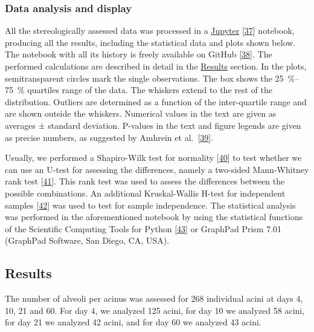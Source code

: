 \documentclass[
  american,
]{article}
\begin{document}
\hypertarget{data-analysis-and-display}{%
\subsubsection{Data analysis and display}\label{data-analysis-and-display}}

All the stereologically assessed data was processed in a \href{http://jupyter.org/}{Jupyter} {[}\protect\hyperlink{ref-pQ6Wbz73}{37}{]} notebook, producing all the results, including the statistical data and plots shown below.
The notebook with all its history is freely available on GitHub {[}\protect\hyperlink{ref-V87xbt0b}{38}{]}.
The performed calculations are described in detail in the \protect\hyperlink{results}{Results} section.
In the plots, semitransparent circles mark the single observations.
The box shows the 25~\%--75~\% quartiles range of the data.
The whiskers extend to the rest of the distribution.
Outliers are determined as a function of the inter-quartile range and are shown outside the whiskers.
Numerical values in the text are given as averages ± standard deviation.
P-values in the text and figure legends are given as precise numbers, as suggested by Amhrein et al.~{[}\protect\hyperlink{ref-o21zxPIu}{39}{]}.

Usually, we performed a Shapiro-Wilk test for normality {[}\protect\hyperlink{ref-IkHrgIj3}{40}{]} to test whether we can use an U-test for assessing the differences, namely a two-sided Mann-Whitney rank test {[}\protect\hyperlink{ref-MyzxBJ57}{41}{]}.
This rank test was used to assess the differences between the possible combinations.
An additional Kruskal-Wallis H-test for independent samples {[}\protect\hyperlink{ref-ON1Bppkk}{42}{]} was used to test for sample independence.
The statistical analysis was performed in the aforementioned notebook by using the statistical functions of the Scientific Computing Tools for Python {[}\protect\hyperlink{ref-8Miti2Gz}{43}{]} or GraphPad Prism 7.01 (GraphPad Software, San Diego, CA, USA).

\hypertarget{results}{%
\subsection{Results}\label{results}}

The number of alveoli per acinus was assessed for 268 individual acini at days 4, 10, 21 and 60.
For day 4, we analyzed 125 acini, for day 10 we analyzed 58 acini, for day 21 we analyzed 42 acini, and for day 60 we analyzed 43 acini.
\end{document}

